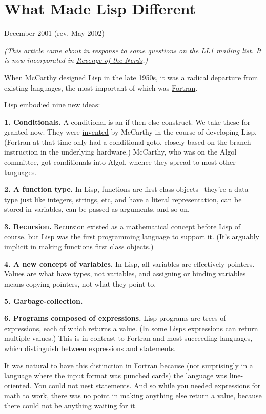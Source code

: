 \chapter{What Made Lisp Different}

December 2001 (rev. May 2002)

\emph{(This article came about in response to some questions on the
\href{http://ll1.mit.edu}{LL1} mailing list. It is now incorporated in
\href{icad.html}{Revenge of the Nerds}.)}

When McCarthy designed Lisp in the late 1950s, it was a radical
departure from existing languages, the most important of which was
\href{history.html}{Fortran}.

Lisp embodied nine new ideas:

\textbf{1. Conditionals.} A conditional is an if-then-else construct. We
take these for granted now. They were
\href{http://www-formal.stanford.edu/jmc/history/lisp/node2.html}{invented}
by McCarthy in the course of developing Lisp. (Fortran at that time only
had a conditional goto, closely based on the branch instruction in the
underlying hardware.) McCarthy, who was on the Algol committee, got
conditionals into Algol, whence they spread to most other languages.

\textbf{2. A function type.} In Lisp, functions are first class
objects-- they're a data type just like integers, strings, etc, and have
a literal representation, can be stored in variables, can be passed as
arguments, and so on.

\textbf{3. Recursion.} Recursion existed as a mathematical concept
before Lisp of course, but Lisp was the first programming language to
support it. (It's arguably implicit in making functions first class
objects.)

\textbf{4. A new concept of variables.} In Lisp, all variables are
effectively pointers. Values are what have types, not variables, and
assigning or binding variables means copying pointers, not what they
point to.

\textbf{5. Garbage-collection.}

\textbf{6. Programs composed of expressions.} Lisp programs are trees of
expressions, each of which returns a value. (In some Lisps expressions
can return multiple values.) This is in contrast to Fortran and most
succeeding languages, which distinguish between expressions and
statements.

It was natural to have this distinction in Fortran because (not
surprisingly in a language where the input format was punched cards) the
language was line-oriented. You could not nest statements. And so while
you needed expressions for math to work, there was no point in making
anything else return a value, because there could not be anything
waiting for it.

